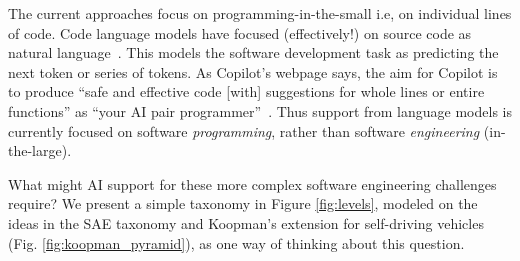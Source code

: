\label{chapter:Exp}

The current approaches focus on programming-in-the-small \cite{DeRemer1976} i.e, on individual lines of code. 
Code language models have focused (effectively!) on source code as natural language~\cite{natural}.
This models the software development task as predicting the next token or series of tokens.
As Copilot's webpage says, the aim for Copilot is to produce ``safe and effective code [with] suggestions for whole lines or entire functions'' as ``your AI pair programmer''~\cite{Copilot-web}. 
Thus support from language models is currently focused on software \textit{programming}, rather than software \emph{engineering} (in-the-large). 

What might AI support for these more complex software engineering challenges require? 
We present a simple taxonomy in Figure \ref{fig:levels}, modeled on the ideas in the SAE taxonomy and Koopman's extension for self-driving vehicles (Fig. \ref{fig:koopman_pyramid}), as one way of thinking about this question. 





